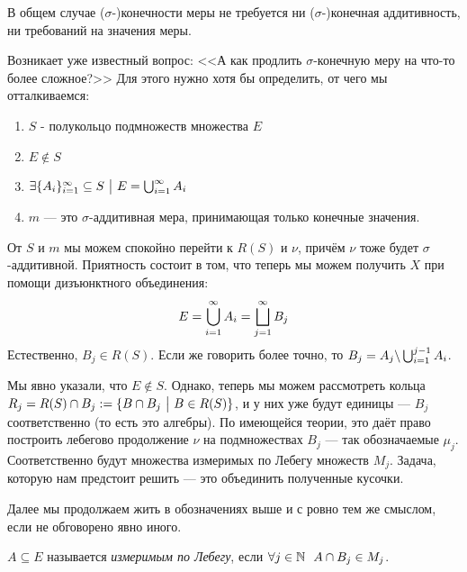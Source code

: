 \begin{note}
	В общем случае ($\sigma$-)конечности меры не требуется ни ($\sigma$-)конечная аддитивность, ни требований на значения меры.
\end{note}

\begin{note}
	Возникает уже известный вопрос: <<А как продлить $\sigma$-конечную меру на что-то более сложное?>> Для этого нужно хотя бы определить, от чего мы отталкиваемся:
	\begin{enumerate}
		\item $S$ - полукольцо подмножеств множества $E$
		
		\item $E \notin S$
		
		\item $\exists \{A_i\}_{i = 1}^\infty \subseteq S \ \big|\  E = \bigcup_{i = 1}^\infty A_i$
		
		\item $m$ --- это $\sigma$-аддитивная мера, принимающая только конечные значения.
	\end{enumerate}
	От $S$ и $m$ мы можем спокойно перейти к $R(S)$ и $\nu$, причём $\nu$ тоже будет $\sigma$-аддитивной. Приятность состоит в том, что теперь мы можем получить $X$ при помощи дизъюнктного объединения:
	\[
		E = \bigcup_{i = 1}^\infty A_i = \bigsqcup_{j = 1}^\infty B_j
	\]
	Естественно, $B_j \in R(S)$. Если же говорить более точно, то $B_j = A_j \backslash \bigcup_{i = 1}^{j - 1} A_i$.
	
	Мы явно указали, что $E \notin S$. Однако, теперь мы можем рассмотреть кольца $R_j = R(S) \cap B_j := \{B \cap B_j \ \big|\  B \in R(S)\}$, и у них уже будут единицы --- $B_j$ соответственно (то есть это алгебры). По имеющейся теории, это даёт право построить лебегово продолжение $\nu$ на подмножествах $B_j$ --- так обозначаемые $\mu_j$. Соответственно будут множества измеримых по Лебегу множеств $M_j$. Задача, которую нам предстоит решить --- это объединить полученные кусочки.
\end{note}

\begin{note}
	Далее мы продолжаем жить в обозначениях выше и с ровно тем же смыслом, если не обговорено явно иного.
\end{note}

\begin{definition}
	$A \subseteq E$ называется \textit{измеримым по Лебегу}, если $\forall j \in \mathbb{N}\ \ A \cap B_j \in M_j$.
\end{definition}

